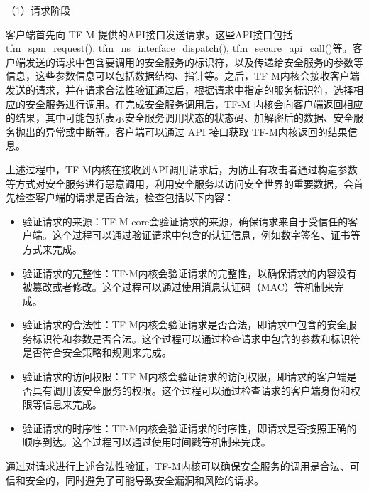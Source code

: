 \documentclass[12pt,a4paper]{ctexart}
\begin{document}
（1）请求阶段\\
\par 客户端首先向 TF-M 提供的API接口发送请求。这些API接口包括tfm\_spm\_request(), tfm\_ns\_interface\_dispatch(), tfm\_secure\_api\_call()等。客户端发送的请求中包含要调用的安全服务的标识符，以及传递给安全服务的参数等信息，这些参数信息可以包括数据结构、指针等。之后，TF-M内核会接收客户端发送的请求，并在请求合法性验证通过后，根据请求中指定的服务标识符，选择相应的安全服务进行调用。在完成安全服务调用后，TF-M 内核会向客户端返回相应的结果，其中可能包括表示安全服务调用状态的状态码、加解密后的数据、安全服务抛出的异常或中断等。客户端可以通过 API 接口获取 TF-M内核返回的结果信息。
\par 上述过程中，TF-M内核在接收到API调用请求后，为防止有攻击者通过构造参数等方式对安全服务进行恶意调用，利用安全服务以访问安全世界的重要数据，会首先检查客户端的请求是否合法，检查包括以下内容：
\begin{itemize}
    \item 验证请求的来源：TF-M core会验证请求的来源，确保请求来自于受信任的客户端。这个过程可以通过验证请求中包含的认证信息，例如数字签名、证书等方式来完成。
    \item 验证请求的完整性：TF-M内核会验证请求的完整性，以确保请求的内容没有被篡改或者修改。这个过程可以通过使用消息认证码（MAC）等机制来完成。
    \item  验证请求的合法性：TF-M内核会验证请求是否合法，即请求中包含的安全服务标识符和参数是否合法。这个过程可以通过检查请求中包含的参数和标识符是否符合安全策略和规则来完成。
    \item  验证请求的访问权限：TF-M内核会验证请求的访问权限，即请求的客户端是否具有调用该安全服务的权限。这个过程可以通过检查请求的客户端身份和权限等信息来完成。
    \item  验证请求的时序性：TF-M内核会验证请求的时序性，即请求是否按照正确的顺序到达。这个过程可以通过使用时间戳等机制来完成。
\end{itemize}
 \par 通过对请求进行上述合法性验证，TF-M内核可以确保安全服务的调用是合法、可信和安全的，同时避免了可能导致安全漏洞和风险的请求。
\end{document}
